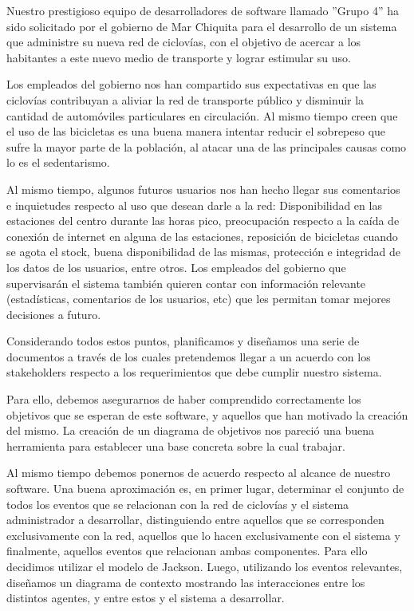 Nuestro prestigioso equipo de desarrolladores de software llamado ''Grupo 4'' ha sido solicitado por el gobierno de
Mar Chiquita para el desarrollo de un sistema que administre su nueva red de ciclovías, con el objetivo de acercar
a los habitantes a este nuevo medio de transporte y lograr estimular su uso.

Los empleados del gobierno nos han compartido sus expectativas en que las ciclovías contribuyan a aliviar la 
red de transporte público y disminuir la cantidad de automóviles particulares en circulación. Al mismo tiempo
creen que el uso de las bicicletas es una buena manera intentar reducir el sobrepeso que sufre la mayor parte 
de la población, al atacar una de las principales causas como lo es el sedentarismo. 

Al mismo tiempo, algunos futuros usuarios nos han hecho llegar sus comentarios e inquietudes respecto al uso que
desean darle a la red: Disponibilidad en las estaciones del centro durante las horas pico, preocupación respecto
a la caída de conexión de internet en alguna de las estaciones, reposición de bicicletas cuando se agota el stock,
buena disponibilidad de las mismas, protección e integridad de los datos de los usuarios, entre otros. 
Los empleados del gobierno que supervisarán el sistema también quieren contar con información relevante (estadísticas,
comentarios de los usuarios, etc) que les permitan tomar mejores decisiones a futuro.

Considerando todos estos puntos, planificamos y diseñamos una serie de documentos a través de los cuales pretendemos 
llegar a un acuerdo con los stakeholders respecto a los requerimientos que debe cumplir nuestro sistema.

Para ello, debemos asegurarnos
de haber comprendido correctamente los objetivos que se esperan de este software, y aquellos que han motivado la
creación del mismo. La creación de un diagrama de objetivos nos pareció una buena herramienta para establecer
una base concreta sobre la cual trabajar.

Al mismo tiempo debemos ponernos de acuerdo respecto al alcance de nuestro software.
Una buena aproximación es, en primer lugar, determinar el conjunto de todos los eventos que se relacionan con 
la red de ciclovías y el sistema administrador a desarrollar, distinguiendo entre aquellos que se corresponden 
exclusivamente con la red, aquellos que lo hacen exclusivamente con el sistema y finalmente, aquellos 
eventos que relacionan ambas componentes. Para ello decidimos utilizar el modelo de Jackson.
Luego, utilizando los eventos relevantes, diseñamos un diagrama de contexto mostrando
las interacciones entre los distintos agentes, y entre estos y el sistema a desarrollar.